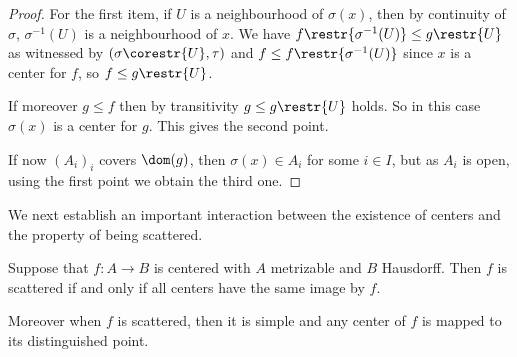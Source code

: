 \begin{proof}
For the first item, if $U$ is a neighbourhood of $\sigma(x)$, then by continuity of $\sigma$, $\sigma^{-1}(U)$ is a neighbourhood of $x$.
We have $f\restr{\sigma^{-1}(U)}\leq g\restr{U}$ as witnessed by $(\sigma\corestr{U},\tau)$ and $f\leq f\restr{\sigma^{-1}(U)}$ since $x$ is a center for $f$, so $f\leq g\restr{U}$.

If moreover $g\leq f$ then by transitivity $g\leq g\restr{U}$ holds. So in this case $\sigma(x)$ is a center for $g$. This gives the second point.

If now $(A_i)_i$ covers $\dom(g)$, then $\sigma(x)\in A_i$ for some $i\in I$, but as $A_i$ is open, using the first point we obtain the third one.
\end{proof}

We next establish an important interaction between the existence of centers and the property of being scattered. 

\begin{proposition}\label{scatteredhavecocenter}
Suppose that $f:A\to B$ is centered with $A$ metrizable and $B$ Hausdorff.
Then $f$ is scattered if and only if all centers have the same image by $f$.

Moreover when $f$ is scattered, then it is simple and any center of $f$ is mapped to its distinguished point.
\end{proposition} 

